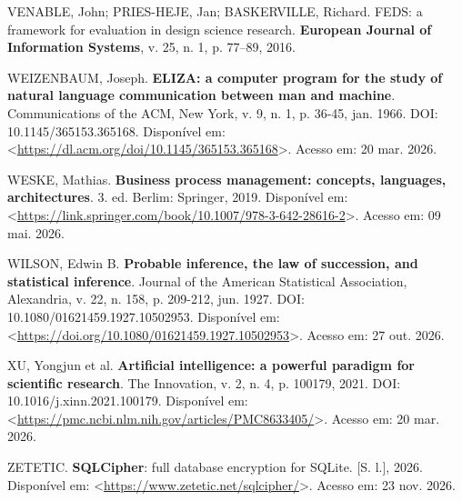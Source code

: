 \documentclass[12pt,a4paper]{extarticle}
\begin{document}
\vspace{0.5cm}\noindent
VENABLE, John; PRIES-HEJE, Jan; BASKERVILLE, Richard. FEDS: a framework for evaluation in design science research. \textbf{European Journal of Information Systems}, v. 25, n. 1, p. 77--89, 2016.

\vspace{0.5cm}\noindent
WEIZENBAUM, Joseph. \textbf{ELIZA: a computer program for the study of natural language communication between man and machine}. Communications of the ACM, New York, v. 9, n. 1, p. 36-45, jan. 1966. DOI: 10.1145/365153.365168. Disponível em: <\url{https://dl.acm.org/doi/10.1145/365153.365168}>. Acesso em: 20 mar. 2026.

\vspace{0.5cm}\noindent
WESKE, Mathias. \textbf{Business process management: concepts, languages, architectures}. 3. ed. Berlim: Springer, 2019. Disponível em: <\url{https://link.springer.com/book/10.1007/978-3-642-28616-2}>. Acesso em: 09 mai. 2026.

\vspace{0.5cm}\noindent
WILSON, Edwin B. \textbf{Probable inference, the law of succession, and statistical inference}. Journal of the American Statistical Association, Alexandria, v. 22, n. 158, p. 209-212, jun. 1927. DOI: 10.1080/01621459.1927.10502953. Disponível em: <\url{https://doi.org/10.1080/01621459.1927.10502953}>. Acesso em: 27 out. 2026.

\vspace{0.5cm}\noindent
XU, Yongjun et al. \textbf{Artificial intelligence: a powerful paradigm for scientific research}. The Innovation, v. 2, n. 4, p. 100179, 2021. DOI: 10.1016/j.xinn.2021.100179. Disponível em: <\url{https://pmc.ncbi.nlm.nih.gov/articles/PMC8633405/}>. Acesso em: 20 mar. 2026.

\vspace{0.5cm}\noindent
ZETETIC. \textbf{SQLCipher}: full database encryption for SQLite. [S. l.], 2026. Disponível em: <\url{https://www.zetetic.net/sqlcipher/}>. Acesso em: 23 nov. 2026.
\end{document}
